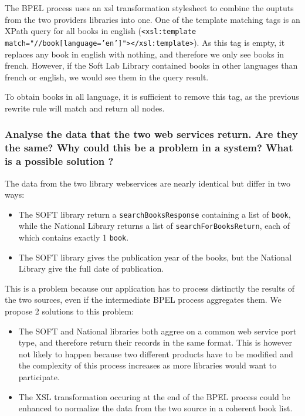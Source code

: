 The BPEL process uses an xsl transformation stylesheet to combine the ouptuts from the two providers libraries into one. One of the template matching tags is an XPath query for all books in english (\texttt{<xsl:template match="//book[language='en']"></xsl:template>}). As this tag is empty, it replaces any book in english with nothing, and therefore we only see books in french. However, if the Soft Lab Library contained books in other languages than french or english, we would see them in the query result.

To obtain books in all language, it is sufficient to remove this tag, as the previous rewrite rule will match and return all nodes.

\subsubsection{Analyse the data that the two web services return. Are they the same? Why could this be a problem in a system? What is a possible solution ?}

The data from the two library webservices are nearly identical but differ in two ways:
\begin{itemize}
  \item The SOFT library return a \texttt{searchBooksResponse} containing a list of \texttt{book}, while the National Library returns a list of \texttt{searchForBooksReturn}, each of which contains exactly 1 \texttt{book}.
  \item The SOFT library gives the publication year of the books, but the National Library give the full date of publication.
\end{itemize}

This is a problem because our application has to process distinctly the results of the two sources, even if the intermediate BPEL process aggregates them. We propose 2 solutions to this problem:

\begin{itemize}
  \item The SOFT and National libraries both aggree on a common web service port type, and therefore return their records in the same format. This is however not likely to happen because two different products have to be modified and the complexity of this process increases as more libraries would want to participate.
  \item The XSL transformation occuring at the end of the BPEL process could be enhanced to normalize the data from the two source in a coherent book list.
\end{itemize}


